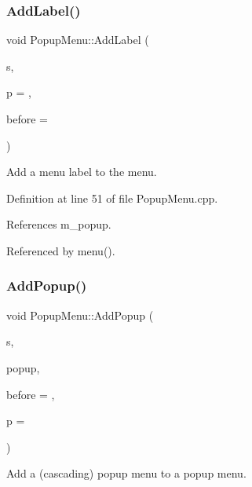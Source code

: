 \subsubsection{\texorpdfstring{Add\+Label()}{AddLabel()}}
{\footnotesize\ttfamily void Popup\+Menu\+::\+Add\+Label (\begin{DoxyParamCaption}\item[{const char $\ast$}]{s,  }\item[{const T\+G\+Picture $\ast$}]{p = {},  }\item[{T\+G\+Menu\+Entry $\ast$}]{before = {} }\end{DoxyParamCaption})\hspace{0.3cm}{\ttfamily [virtual]}}



Add a menu label to the menu. 



Definition at line 51 of file Popup\+Menu.\+cpp.



References m\+\_\+popup.



Referenced by menu().

\hypertarget{class_d_d4hep_1_1_popup_menu_a8c29cafca2fe99eb2f561ed130616b7f}{}\label{class_d_d4hep_1_1_popup_menu_a8c29cafca2fe99eb2f561ed130616b7f} 
\subsubsection{\texorpdfstring{Add\+Popup()}{AddPopup()}}
{\footnotesize\ttfamily void Popup\+Menu\+::\+Add\+Popup (\begin{DoxyParamCaption}\item[{const char $\ast$}]{s,  }\item[{T\+G\+Popup\+Menu $\ast$}]{popup,  }\item[{T\+G\+Menu\+Entry $\ast$}]{before = {},  }\item[{const T\+G\+Picture $\ast$}]{p = {} }\end{DoxyParamCaption})\hspace{0.3cm}{\ttfamily [virtual]}}



Add a (cascading) popup menu to a popup menu. 




